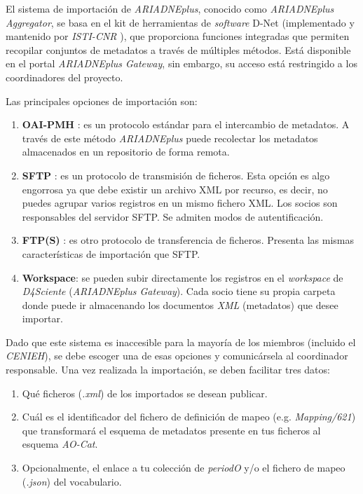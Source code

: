 El sistema de importación de \emph{ARIADNEplus}, conocido como \emph{ARIADNEplus}
\emph{Aggregator}, se basa en el kit de herramientas de \emph{software}
D-Net (implementado y mantenido por \emph{ISTI-CNR} \cite{weboff:isti}), 
que proporciona funciones integradas que permiten recopilar conjuntos 
de metadatos a través de múltiples métodos. Está disponible en el portal 
\emph{ARIADNEplus Gateway}, sin embargo, su acceso está restringido a los 
coordinadores del proyecto. 

Las principales opciones de importación son:

\begin{enumerate}
\def\labelenumi{\arabic{enumi}.}
\tightlist
\item
  \textbf{OAI-PMH} \cite{weboff:oai}: es un protocolo estándar para el intercambio de
  metadatos. A través de este método \emph{ARIADNEplus} puede recolectar los
  metadatos almacenados en un repositorio de forma remota.
\item
  \textbf{SFTP} \cite{weboff:sftp} : es un protocolo de transmisión de ficheros. Esta opción
  es algo engorrosa ya que debe existir un archivo XML por recurso, es
  decir, no puedes agrupar varios registros en un mismo fichero XML. Los
  socios son responsables del servidor SFTP. Se admiten modos de
  autentificación.
\item
  \textbf{FTP(S)} \cite{weboff:ftp}: es otro protocolo de transferencia de ficheros.
  Presenta las mismas características de importación que SFTP.
\item
  \textbf{Workspace}: se pueden subir directamente los registros en el
  \emph{workspace} de \emph{D4Sciente} (\emph{ARIADNEplus Gateway}). Cada socio tiene
  su propia carpeta donde puede ir almacenando los documentos \emph{XML}
  (metadatos) que desee importar.
\end{enumerate}

Dado que este sistema es inaccesible para la mayoría de los miembros
(incluido el \emph{CENIEH}), se debe escoger una de esas opciones y
comunicársela al coordinador responsable. Una vez realizada la
importación, se deben facilitar tres datos:

\begin{enumerate}
\tightlist
\item
  Qué ficheros (\emph{.xml}) de los importados se desean publicar.
\item
  Cuál es el identificador del fichero de definición de mapeo (e.g.
  \emph{Mapping/621}) que transformará el esquema de metadatos presente
  en tus ficheros al esquema \emph{AO-Cat}.
\item
  Opcionalmente, el enlace a tu colección de \emph{periodO} y/o el fichero de
  mapeo (\emph{.json}) del vocabulario.
\end{enumerate}

